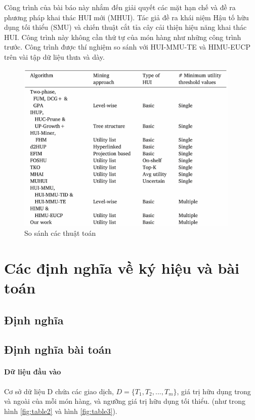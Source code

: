 Công trình của bài báo này nhắm đến giải quyết các mặt hạn chế và đề ra phương pháp khai thác HUI mới (MHUI). Tác giả đề ra khái niệm Hậu tố hữu dụng tối thiểu (SMU) và chiến thuật cắt tỉa cây cải thiện hiệu năng khai thác HUI. Công trình này không cần thứ tự của món hàng như những công trình trước. Công trình được thí nghiệm so sánh với HUI-MMU-TE \cite{lin2016cefficient} và HIMU-EUCP \cite{gan2016more} trên vài tập dữ liệu thưa và dày. 


\begin{figure}[h]
\centering
\includegraphics[width=0.95\textwidth]{image/table/table1-boring.jpg}
\caption{\label{figtable1} So sánh các thuật toán}
\end{figure}

\section{Các định nghĩa về ký hiệu và bài toán}

\subsection{Định nghĩa}
 

\subsection{Định nghĩa bài toán}

\paragraph{Dữ liệu đầu vào} Cơ sở dữ liệu D chứa các giao dịch, $D = \{T_1, T_2, ..., T_m\}$, giá trị hữu dụng trong và ngoài của mỗi món hàng, và ngưỡng giá trị hữu dụng tối thiểu. (như trong hình \ref{fig:table2} và hình \ref{fig:table3}).


